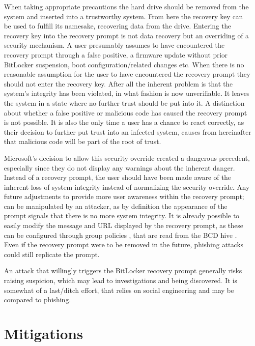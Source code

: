 When taking appropriate precautions the hard drive should be removed from the system and inserted into a trustworthy system.
From here the recovery key can be used to fulfill its namesake, recovering data from the drive.
Entering the recovery key into the recovery prompt is not data recovery but an overriding of a security mechanism.
A user presumably assumes to have encountered the recovery prompt through a false positive, a firmware update without prior BitLocker suspension, boot configuration\-/related changes etc.
When there is no reasonable assumption for the user to have encountered the recovery prompt they should not enter the recovery key.
After all the inherent problem is that the system's integrity has been violated, in what fashion is now unverifiable.
It leaves the system in a state where no further trust should be put into it.
A distinction about whether a false positive or malicious code has caused the recovery prompt is not possible.
It is also the only time a user has a chance to react correctly, as their decision to further put trust into an infected system, causes from hereinafter that malicious code will be part of the root of trust.

Microsoft's decision to allow this security override created a dangerous precedent, especially since they do not display any warnings about the inherent danger.
Instead of a recovery prompt, the user should have been made aware of the inherent loss of system integrity instead of normalizing the security override.
Any future adjustments to provide more user awareness within the recovery prompt; can be manipulated by an attacker, as by definition the appearance of the prompt signals that there is no more system integrity.
It is already possible to easily modify the message and \ac{URL} displayed by the recovery prompt, as these can be configured through group policies \cite{microsoft-windows-bitlocker-group-policy-settings-url}, that are read from the \ac{BCD} hive \cite{microsoft-windows-bcd-settings-and-bitlocker}.
Even if the recovery prompt were to be removed in the future, phishing attacks could still replicate the prompt.

An attack that willingly triggers the BitLocker recovery prompt generally risks raising suspicion, which may lead to investigations and being discovered.
It is somewhat of a last\-/ditch effort, that relies on social engineering and may be compared to phishing.

\section{Mitigations}

